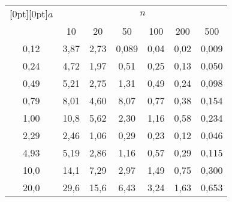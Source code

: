\begin{table*}
\begin{center}
\tabcolsep=12pt
\begin{tabular}{|c|c|c|c|c|c|c|}
\hline
\multicolumn{1}{|c|}{\raisebox{-6pt}[0pt][0pt]{$a$}}&\multicolumn{6}{c|}{$n$}\\
\cline{2-7}
& 10 & 20 & 50 & 100 & 200 & 500\\
 \hline
 0{,}12 & 3{,}87 & 2{,}73 & 0{,}089 & 0{,}04 & 0{,}02 & 0{,}009 \\
 0{,}24 & 4{,}72 & 1{,}97 & 0{,}51 & 0{,}25 & 0{,}13 & 0{,}050 \\
 0{,}49 & 5{,}21 & 2{,}75 & 1{,}31 & 0{,}49 & 0{,}24 & 0{,}098 \\
 0{,}79 & 8{,}01 & 4{,}60 & 8{,}07 & 0{,}77 & 0{,}38 & 0{,}154 \\
 1{,}00 & 10{,}8 & 5{,}62 & 2{,}30 & 1{,}16 & 0{,}58 & 0{,}234 \\
 2{,}29 & 2{,}46 & 1{,}06 & 0{,}29 & 0{,}23 & 0{,}12 & 0{,}046 \\
 4{,}93 & 5{,}19 & 2{,}86 & 1{,}16 & 0{,}57 & 0{,}29 & 0{,}115 \\
 10{,}0 & 14{,}1 & 7{,}29 & 2{,}97 & 1{,}49 & 0{,}75 & 0{,}300 \\
 20{,}0 & 29{,}6 & 15{,}6 & 6{,}43 & 3{,}24 & 1{,}63 & 0{,}653\\
  \hline
\end{tabular}
\end{center}
\vspace*{18pt}
\end{table*}

